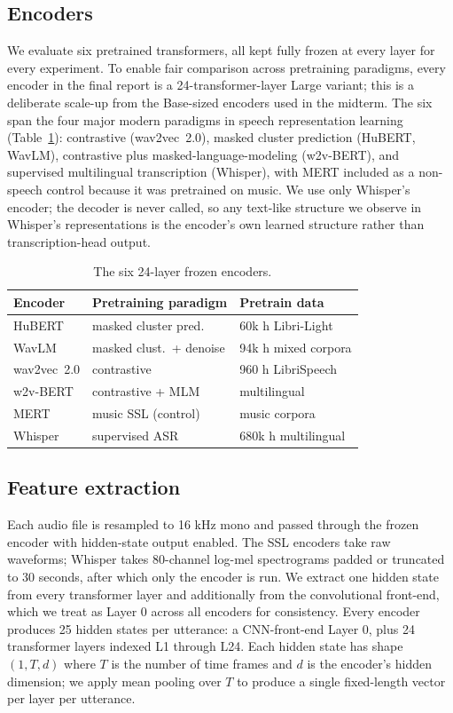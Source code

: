 \documentclass[sigconf,screen]{acmart}
\begin{document}
\subsection{Encoders}
We evaluate six pretrained transformers, all kept fully frozen at every layer for every experiment. To enable fair comparison across pretraining paradigms, every encoder in the final report is a 24-transformer-layer Large variant; this is a deliberate scale-up from the Base-sized encoders used in the midterm. The six span the four major modern paradigms in speech representation learning (Table~\ref{tab:encoders}): contrastive (wav2vec~2.0), masked cluster prediction (HuBERT, WavLM), contrastive plus masked-language-modeling (w2v-BERT), and supervised multilingual transcription (Whisper), with MERT included as a non-speech control because it was pretrained on music. We use only Whisper's encoder; the decoder is never called, so any text-like structure we observe in Whisper's representations is the encoder's own learned structure rather than transcription-head output.

\begin{table}[h]
\centering
\small
\caption{The six 24-layer frozen encoders.}
\label{tab:encoders}
\setlength{\tabcolsep}{4pt}
\begin{tabular}{lll}
\toprule
\textbf{Encoder} & \textbf{Pretraining paradigm} & \textbf{Pretrain data} \\
\midrule
HuBERT      & masked cluster pred.    & 60k h Libri-Light \\
WavLM       & masked clust.\ + denoise & 94k h mixed corpora \\
wav2vec~2.0 & contrastive             & 960 h LibriSpeech \\
w2v-BERT    & contrastive + MLM       & multilingual \\
MERT        & music SSL (control)     & music corpora \\
Whisper     & supervised ASR          & 680k h multilingual \\
\bottomrule
\end{tabular}
\end{table}
\subsection{Feature extraction}
Each audio file is resampled to 16 kHz mono and passed through the frozen encoder with hidden-state output enabled. The SSL encoders take raw waveforms; Whisper takes 80-channel log-mel spectrograms padded or truncated to 30 seconds, after which only the encoder is run. We extract one hidden state from every transformer layer and additionally from the convolutional front-end, which we treat as Layer 0 across all encoders for consistency. Every encoder produces 25 hidden states per utterance: a CNN-front-end Layer 0, plus 24 transformer layers indexed L1 through L24. Each hidden state has shape $(1, T, d)$ where $T$ is the number of time frames and $d$ is the encoder's hidden dimension; we apply mean pooling over $T$ to produce a single fixed-length vector per layer per utterance.
\end{document}
